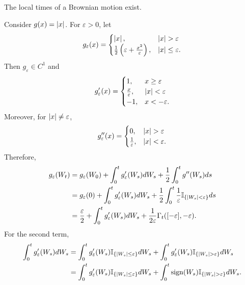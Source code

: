 \begin{thm}
    The local times of a Brownian motion exist.
\end{thm}

\noindent Consider $g(x) = \left\lvert x\right\lvert$. For $\varepsilon > 0$, let
\begin{equation*}
    g_\varepsilon(x) = \begin{cases}
        \left\lvert x\right\lvert,& \left\lvert x\right\lvert > \varepsilon \\
        \frac{1}{2}\left(\varepsilon+ \frac{x^2}{\varepsilon}\right),& \left\lvert x\right\lvert \leq \varepsilon.
    \end{cases}
\end{equation*}
Then $g_\varepsilon \in C^1$ and
\begin{equation*}
    g^\prime_\varepsilon(x) = \begin{cases}
        1,&x \geq \varepsilon \\
        \frac{x}{\varepsilon},&\left\lvert x\right\lvert < \varepsilon \\
        -1,& x < -\varepsilon.
    \end{cases}
\end{equation*}
Moreover, for $\left\lvert x\right\lvert \neq \varepsilon$,
\begin{equation*}
    g^{\prime\prime}_\varepsilon(x) = \begin{cases}
        0,&\left\lvert x\right\lvert > \varepsilon \\
        \frac{1}{\varepsilon},&\left\lvert x\right\lvert < \varepsilon.
    \end{cases}
\end{equation*}
Therefore,
\begin{align*}
    g_\varepsilon(W_t) &= g_\varepsilon(W_0) + \int_0^t g_\varepsilon^\prime(W_s)dW_s + \frac{1}{2}\int_0^t g^{\prime\prime}(W_s)ds \\
    &= g_\varepsilon(0) + \int_0^t g_\varepsilon^\prime(W_s)dW_s + \frac{1}{2} \int_0^t \frac{1}{\varepsilon}\mathbb{I}_{\left\{\left\lvert W_s\right\lvert < \varepsilon\right\} } ds \\
    &= \frac{\varepsilon}{2} + \int_0^t g_\varepsilon^\prime(W_s)dW_s + \frac{1}{2 \varepsilon} \Gamma_t([-\varepsilon],-\varepsilon).
\end{align*}
For the second term,
\begin{align*}
    \int_0^t g_\varepsilon^\prime(W_s)dW_s & = \int_0^t g_\varepsilon^\prime(W_s)\mathbb{I}_{\left\{\left\lvert W_s\right\lvert \leq \varepsilon\right\}}dW_s +\int_0^t g_\varepsilon^\prime(W_s)\mathbb{I}_{\left\{\left\lvert W_s\right\lvert > \varepsilon\right\}}dW_s \\
    &= \int_0^t g_\varepsilon^\prime(W_s)\mathbb{I}_{\left\{\left\lvert W_s\right\lvert \leq \varepsilon\right\}}dW_s +\int_0^t \operatorname{sign}(W_s)\mathbb{I}_{\left\{\left\lvert W_s\right\lvert > \varepsilon\right\}}dW_s. \\
\end{align*}
